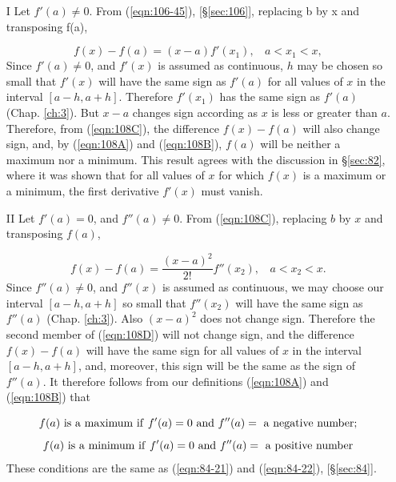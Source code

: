 \begin{itemize}
\item[I] 
Let $f'(a) \ne 0$.
From (\ref{eqn:106-45}), [\S \ref{sec:106}], 
replacing b by x and transposing f(a),

\begin{equation}
\label{eqn:108C}
f(x)-f(a) = (x-a)f'(x_1),\ \ \ \ a < x_1 < x,
\end{equation}
Since $f'(a) \ne 0$, and $f'(x)$ is assumed as continuous, $h$ 
may be chosen so small that $f'(x)$ will have the same sign 
as $f'(a)$ for all values of $x$ in the interval $[a - h, a + h]$. 
Therefore $f'(x_1)$ has the same sign as $f'(a)$ (Chap. \ref{ch:3}). 
But $x-a$ changes sign according as $x$ is less or greater than $a$. 
Therefore, from (\ref{eqn:108C}), the difference
$f(x)-f(a)$
will also change sign, and, by (\ref{eqn:108A}) and (\ref{eqn:108B}), 
$f(a)$ will be neither a maximum nor a minimum. This result 
agrees with the discussion in \S \ref{sec:82}, where it was 
shown that for all values of $x$ for which $f(x)$ is a maximum 
or a minimum, the first derivative $f'(x)$ must vanish.

\item[II]
Let $f'(a) = 0$, and $f''(a) \ne 0$.
From (\ref{eqn:108C}), replacing $b$ by $x$ and transposing $f(a)$,

\begin{equation}
\label{eqn:108D}
f(x)-f(a) = \frac{(x - a)^2}{2!} f''(x_2),\ \ \ \ a < x_2 < x.
\end{equation}
Since $f''(a) \ne 0$, and $f''(x)$ is assumed as continuous, we 
may choose our interval $[a - h, a + h]$ so small that 
$f''(x_2)$ will have the same sign as $f''(a)$ (Chap. \ref{ch:3}). 
Also $(x-a)^2$ does not change sign. Therefore the second 
member of (\ref{eqn:108D}) will not change sign, and the difference
$f(x)-f(a)$
will have the same sign for all values of $x$ in the interval 
$[a - h, a + h]$, and, moreover, this sign will be the same 
as the sign of $f''(a)$.
It therefore follows from our definitions 
(\ref{eqn:108A}) and (\ref{eqn:108B}) that

\begin{equation}
\label{eqn:108E}
f(a)\ {\rm is\ a\ maximum\ if}\ f'(a) = 0 \ {\rm and}\ f''(a) 
=\ {\rm a\ negative\ number};
\end{equation}
\begin{equation}
\label{eqn:108F}
f(a)\ {\rm is\ a\ minimum\ if}\ f'(a) = 0 \ {\rm and}\ f''(a) 
=\ {\rm a\ positive\ number}
\end{equation}
These conditions are the same as (\ref{eqn:84-21}) and (\ref{eqn:84-22}), 
[\S \ref{sec:84}].


\end{itemize}
